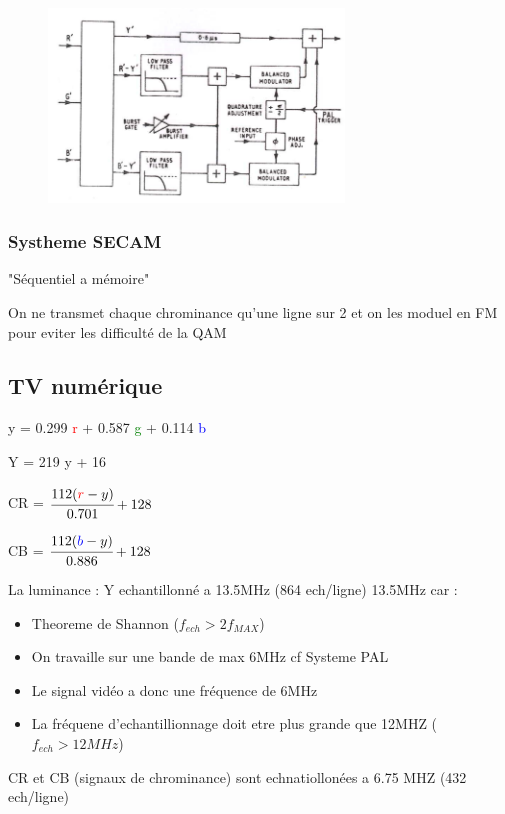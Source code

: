			\begin{figure}[htp]
				\centering
				\includegraphics[width=0.7\textwidth]{img/PAL1.png}
			\end{figure}
				
				
			\subsubsection{Systheme SECAM}
				"Séquentiel a mémoire"
				
				On ne transmet chaque chrominance qu'une ligne sur 2 et on les moduel en FM pour eviter les difficulté de la QAM
				
		\subsection{TV numérique}
			y = 0.299 \textcolor{red}{r} + 0.587 \textcolor{green}{g} + 0.114 \textcolor{blue}{b}
			
			Y = 219 y + 16
			
			CR = $\cfrac{112(\textcolor{red}{r} - y)}{0.701} + 128$
			
			CB = $\cfrac{112(\textcolor{blue}{b} - y)}{0.886} + 128$
			
			
			La luminance : Y echantillonné a 13.5MHz (864 ech/ligne)
			13.5MHz car :
			\begin{itemize}
				\item Theoreme de Shannon ($f_{ech} > 2 f_{MAX}$)
				\item On travaille sur une bande de max 6MHz cf Systeme PAL
				\item Le signal vidéo a donc une fréquence de 6MHz
				\item La fréquene d'echantillionnage doit etre plus grande que 12MHZ ($f_{ech} > 12MHz$)
			\end{itemize}
			
			CR et CB (signaux de chrominance) sont echnatiollonées a 6.75 MHZ (432 ech/ligne)
			

